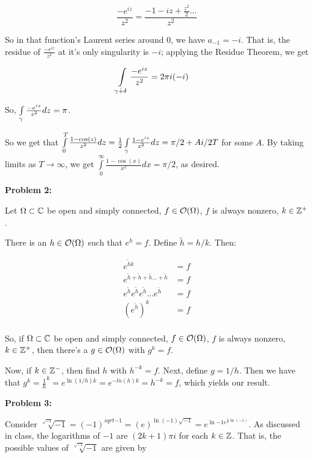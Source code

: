 \documentclass[a4paper,12pt]{article}
\begin{document}
\begin{displaymath}
\frac{-e^{iz}}{z^2} = \frac{-1-iz+\frac{z^2}{2} \ldots }{z^2}
\end{displaymath}

So in that function's Laurent series around $0$, we have $a_{-1} = -i$. That is, the residue of $\frac{-e^{iz}}{z^2}$ at it's only singularity is $-i$; applying the Residue Theorem, we get

\begin{align*}
\int\limits_{\gamma \dot{+} \delta} \frac{-e^{iz}}{z^2} &= 2\pi i (-i)
\end{align*}

So, $\int\limits_{\gamma} \frac{-e^{iz}}{z^2} dz = \pi$.

So we get that $\int\limits_0^T\frac{1-\cos(z)}{z^2} dz = \frac{1}{2}\int\limits_\gamma \frac{1-e^{iz}}{z^2} dz = \pi/2 + Ai/2T$ for some $A$. By taking limits as $T \to \infty$, we get $\int\limits_0^\infty \frac{1-\cos(x)}{x^2} dx = \pi/2$, as desired.

\shunt

{\bf Problem 2:}

Let $\Omega \subset \mathbb{C}$ be open and simply connected, $f \in \mathcal{O} (\Omega)$, $f$ is always nonzero, $k \in \mathbb{Z}^+$.

There is an $h \in \mathcal{O}(\Omega)$ such that $e^h =f$. Define $\tilde{h} = h/k$. Then:

\begin{align*}
e^{\tilde{h}k} &= f\\
e^{\tilde{h}+\tilde{h}+\tilde{h} \ldots +\tilde{h}} &= f\\
e^{\tilde{h}}e^{\tilde{h}}e^{\tilde{h}} \ldots e^{\tilde{h}} &= f\\
(e^{\tilde{h}})^k &= f\\
\end{align*}

So, if $\Omega \subset \mathbb{C}$ be open and simply connected, $f \in \mathcal{O} (\Omega)$, $f$ is always nonzero, $k \in \mathbb{Z}^+$, then there's a $g \in \mathcal{O}(\Omega)$ with $g^k = f$.

Now, if $k \in \mathbb{Z}^-$, then find $h$ with $h^{-k} = f$. Next, define $g = 1/h$. Then we have that $g^k = \frac{1}{h}^k =e^{\ln(1/h)k} = e^{-ln(h)k}= h^{-k} = f$, which yields our result.

\shunt

{\bf Problem 3:}

Consider $\sqrt[\sqrt{-1}]{-1} = (-1)^{sqrt{-1}} = (e)^{\ln(-1)\sqrt{-1}} = e^{\ln{-1}e^{\frac{1}{2}\ln(-1)}}$. As discussed in class, the logarithms of $-1$ are $(2k+1)\pi i$ for each $k \in \mathbb{Z}$. That is, the possible values of $\sqrt[\sqrt{-1}]{-1}$ are given by 
\end{document}
